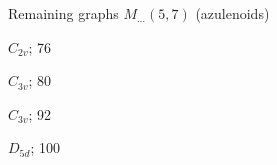 \documentclass[%
pdf,
colorBG,
slideColor,
]{prosper}
\begin{document}
\begin{slide}{Remaining graphs $M_{\dots}(5,7)$ (azulenoids)}

\vspace{-7mm}
\begin{center}
\begin{minipage}{37mm}
\centering
{}\par
$C_{2v}$; 76
\end{minipage}
\begin{minipage}{37mm}
\centering
{}\par
$C_{3v}$; 80
\end{minipage}
\begin{minipage}{37mm}
\centering
{}\par
$C_{3v}$; 92
\end{minipage}
\begin{minipage}{37mm}
\centering
{}\par
$D_{5d}$; 100
\end{minipage}
\end{center}




%



\end{slide}
\end{document}

